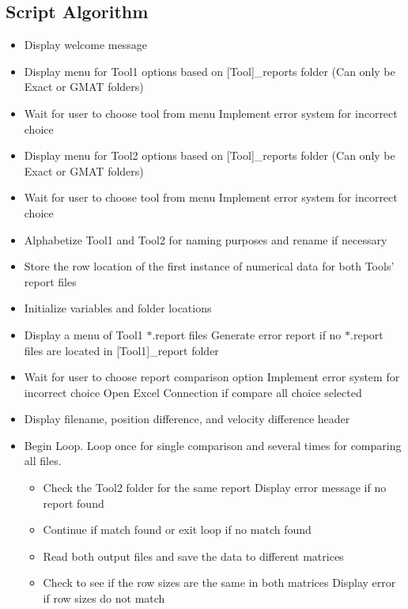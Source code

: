 \subsection{Script Algorithm}
\begin{itemize}
    \item Display welcome message
    \item Display menu for Tool1 options based on [Tool]\_reports
    folder (Can only be Exact or GMAT folders)
    \item Wait for user to choose tool from menu
        \subitem Implement error system for incorrect choice
    \item Display menu for Tool2 options based on [Tool]\_reports
    folder (Can only be Exact or GMAT folders)
    \item Wait for user to choose tool from menu
        \subitem Implement error system for incorrect choice
    \item Alphabetize Tool1 and Tool2 for naming purposes and rename
    if necessary
    \item Store the row location of the first instance of numerical
    data for both Tools' report files
    \item Initialize variables and folder locations
    \item Display a menu of Tool1 $*$.report files
        \subitem Generate error report if no $*$.report files are located
    in [Tool1]\_report folder
    \item Wait for user to choose report comparison option
        \subitem Implement error system for incorrect choice
        \subitem Open Excel Connection if compare all choice selected
    \item Display filename, position difference, and velocity difference header
    \item Begin Loop. Loop once for single comparison and several
    times for comparing all files.
    \begin{itemize}
        \item Check the Tool2 folder for the same report
            \subitem Display error message if no report found
        \item Continue if match found or exit loop if no match found
        \item Read both output files and save the data to different matrices
        \item Check to see if the row sizes are the same in
        both matrices
            \subitem Display error if row sizes do not match

\end{itemize}
\end{itemize}
